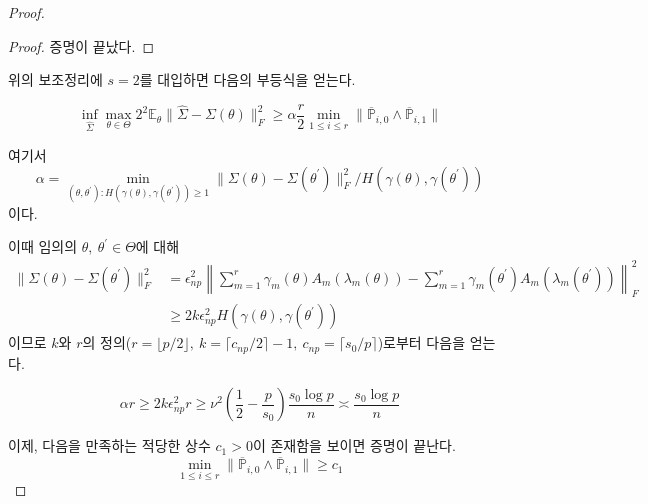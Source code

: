 \begin{proof}
\begin{lemma}
\begin{proof}
증명이 끝났다. 
\end{proof}

\end{lemma}

위의 보조정리에 $s=2$를 대입하면 다음의 부등식을 얻는다. 

\begin{equation*}
    \inf_{\hat{\Sigma}} \max_{\theta \in \Theta} 2^2 \mathbb{E}_\theta \lVert \hat{\Sigma}- \Sigma(\theta) \rVert_F^2 \geq \alpha \frac{r}{2} \min _ {1 \leq i \leq r} \lVert \overline{\mathbb{P}} _ {i, 0} \wedge \overline{\mathbb{P}} _ {i, 1} \rVert
\end{equation*}
 

여기서 
\begin{equation*}
\alpha = \min_{(\theta, \theta^\prime) : H(\gamma(\theta), \gamma(\theta^\prime)) \geq 1} \lVert \Sigma(\theta) - \Sigma(\theta^\prime) \rVert_F^2 / H(\gamma(\theta), \gamma(\theta^\prime))
\end{equation*}
이다. 

이때 임의의 $\theta,~\theta^\prime \in \Theta$에 대해 
\begin{equation*}
\begin{aligned}
\lVert \Sigma(\theta) - \Sigma(\theta^\prime) \rVert_F^2 
&= \epsilon_{np}^2 \left\lVert  \sum_{m=1}^r \gamma_m(\theta) A_m(\lambda_m(\theta)) -  \sum_{m=1}^r \gamma_m(\theta^\prime) A_m(\lambda_m(\theta^\prime)) \right\rVert_F^2 \\
& \geq 2k\epsilon_{np}^2 H(\gamma(\theta), \gamma(\theta^\prime))
\end{aligned}
\end{equation*}
이므로 $k$와 $r$의 정의($r = \lfloor p/2 \rfloor,~k = \lceil c_{np} / 2 \rceil - 1,~ c_{np} = \lceil s_0 / p \rceil$)로부터 다음을 얻는다. 

\begin{equation*}
\alpha r \geq 2k\epsilon_{np}^2 r \geq \nu^2 \left( \frac{1}{2} - \frac{p}{s_0} \right) \frac{s_0 \log p}{n} \asymp \frac{s_0 \log p}{n}
\end{equation*}

이제, 다음을 만족하는 적당한 상수 $c_1 > 0$이 존재함을 보이면 증명이 끝난다. 
\begin{equation*}
\min _ {1 \leq i \leq r} \lVert \overline{\mathbb{P}} _ {i, 0} \wedge \overline{\mathbb{P}} _ {i, 1} \rVert \geq c_1
\end{equation*}

\end{proof}

